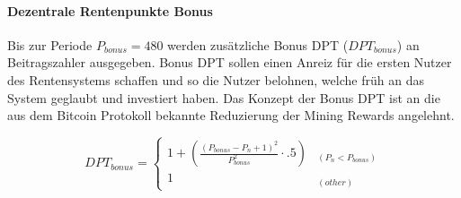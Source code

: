 \paragraph*{Dezentrale Rentenpunkte Bonus}
Bis zur Periode $P_{bonus} = 480$ werden zusätzliche Bonus DPT 
($DPT_{bonus}$) an
Beitragszahler ausgegeben. Bonus DPT sollen einen Anreiz für
die ersten Nutzer des Rentensystems schaffen und so die Nutzer belohnen, 
welche früh an das System geglaubt und investiert haben. Das Konzept der Bonus DPT
ist an die aus dem Bitcoin Protokoll bekannte Reduzierung der Mining Rewards angelehnt.

\begin{equation}
DPT_{bonus} = \begin{cases} 
1 + (\frac{(P_{bonus} - P_{n} + 1)^2}
      {P_{bonus}^2} \cdot .5) & _{(P_{n} < P_{bonus})} \\
1 & _{(other)} 
\end{cases}
\end{equation}


